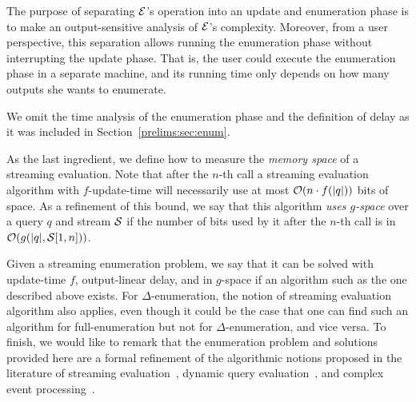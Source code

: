 The purpose of separating $\mathcal{E}$’s operation into an update and enumeration phase is to make an output-sensitive analysis of $\mathcal{E}$’s complexity. Moreover, from a user perspective, this separation allows running the enumeration phase without interrupting the update phase. That is, the user could execute the enumeration phase in a separate machine, and its running time only depends on how many outputs she wants to enumerate.  

We omit the time analysis of the enumeration phase and the definition of delay as it was included in Section~\ref{prelims:sec:enum}.

As the last ingredient, we define how to measure the \emph{memory space} of a streaming evaluation. Note that after the $n$-th call a streaming evaluation algorithm with $f$-update-time will necessarily use at most $\mathcal{O}(n\cdot f(|q|))$ bits of space. As a refinement of this bound, we say that this algorithm \emph{uses $g$-space} over a query $q$ and stream $\mathcal{S}$ if the number of bits used by it after the $n$-th call is in $\mathcal{O}(g(|q|, \mathcal{S}[1, n]))$.

Given a streaming enumeration problem, we say that it can be solved with update-time $f$, output-linear delay, and in $g$-space if an algorithm such as the one described above exists. For $\Delta$-enumeration, the notion of streaming evaluation algorithm also applies, even though it could be the case that one can find such an algorithm for full-enumeration but not for $\Delta$-enumeration, and vice versa. 
To finish, we would like to remark that the enumeration problem and solutions provided here are a formal refinement of the algorithmic notions proposed in the literature of streaming evaluation~\cite{GauwinNT09}, dynamic query evaluation~\cite{BerkholzKS17,IdrisUV17}, and complex event processing~\cite{GrezRU19,GrezR20}.